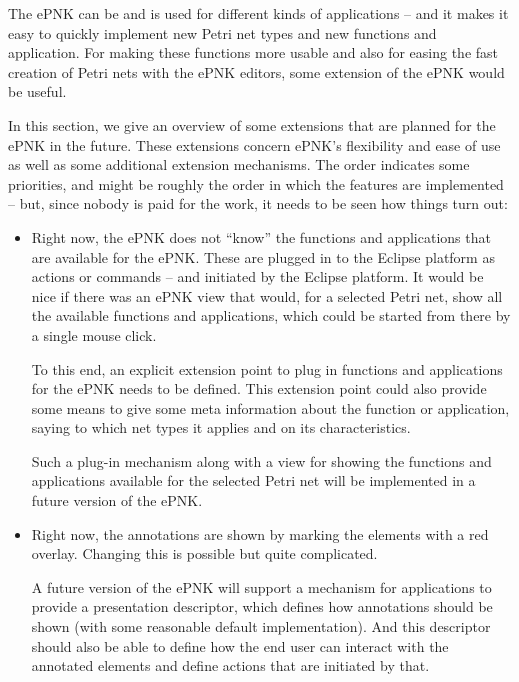 The ePNK can be and is used for different kinds of applications -- and it
makes it easy to quickly implement new Petri net types and new functions
and application. For making these functions more usable and also for
easing the fast creation of Petri nets with the ePNK editors, some
extension of the ePNK would be useful.
 
In this section, we give an overview of some extensions that are planned
for the ePNK in the future. These extensions concern ePNK's flexibility and
ease of use as well as some additional extension mechanisms. The order
indicates some priorities, and might be roughly the order in which the features are
implemented -- but, since nobody is paid for the work, it needs to be seen
how things turn out:
\begin{itemize}
  \item Right now, the ePNK does not ``know'' the functions and applications
        that are available for the ePNK. These are plugged in to the
        Eclipse platform as actions or commands -- and initiated by
        the Eclipse platform. It would be nice if there was an
        ePNK view that would, for a selected Petri net, show all
        the available functions and applications, which could be started
        from there by a single mouse click.
  
        To this end, an explicit extension point to plug in functions and
        applications for the ePNK needs to be defined. This extension point
        could also provide some means to give some meta information about
        the function or application, saying to which net types it applies
        and on its characteristics. 
        
        Such a plug-in mechanism along with a view for showing the
        functions and applications available for the selected Petri net
        will be implemented in a future version of the ePNK.
        
  \item Right now, the annotations are shown by marking the elements with
        a red overlay. Changing this is possible but quite complicated.
        
        A future version of the ePNK will support a mechanism for applications
        to provide a presentation descriptor, which defines how annotations
        should be shown (with some reasonable default implementation). And this
        descriptor should also be able to define how the end user can
        interact with the annotated elements and define actions that
        are initiated by that.
     

\end{itemize}
